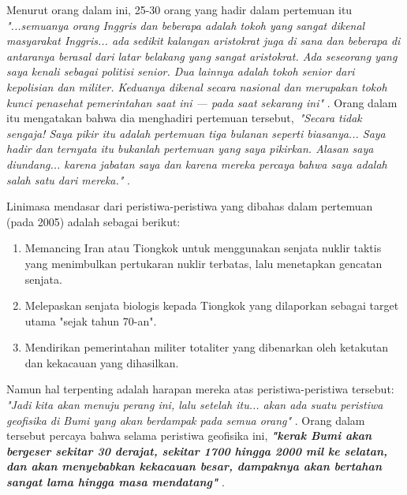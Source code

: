 \documentclass[10pt,twocolumn,letterpaper]{article}
\begin{document}
Menurut orang dalam ini, 25-30 orang yang hadir dalam pertemuan itu \textit{"...semuanya orang Inggris dan beberapa adalah tokoh yang sangat dikenal masyarakat Inggris... ada sedikit kalangan aristokrat juga di sana dan beberapa di antaranya berasal dari latar belakang yang sangat aristokrat. Ada seseorang yang saya kenali sebagai politisi senior. Dua lainnya adalah tokoh senior dari kepolisian dan militer. Keduanya dikenal secara nasional dan merupakan tokoh kunci penasehat pemerintahan saat ini — pada saat sekarang ini"} \cite{4}. Orang dalam itu mengatakan bahwa dia menghadiri pertemuan tersebut,\ \textit{"Secara tidak sengaja! Saya pikir itu adalah pertemuan tiga bulanan seperti biasanya... Saya hadir dan ternyata itu bukanlah pertemuan yang saya pikirkan. Alasan saya diundang... karena jabatan saya dan karena mereka percaya bahwa saya adalah salah satu dari mereka."} \cite{4}.

Linimasa mendasar dari peristiwa-peristiwa yang dibahas dalam pertemuan (pada 2005) adalah sebagai berikut:
\begin{flushleft}
\begin{enumerate}
    \item Memancing Iran atau Tiongkok untuk menggunakan senjata nuklir taktis yang menimbulkan pertukaran nuklir terbatas, lalu menetapkan gencatan senjata.
    \item Melepaskan senjata biologis kepada Tiongkok yang dilaporkan sebagai target utama "sejak tahun 70-an".
    \item Mendirikan pemerintahan militer totaliter yang dibenarkan oleh ketakutan dan kekacauan yang dihasilkan.
\end{enumerate}
\end{flushleft}

Namun hal terpenting adalah harapan mereka atas peristiwa-peristiwa tersebut: \textit{"Jadi kita akan menuju perang ini, lalu setelah itu... akan ada suatu peristiwa geofisika di Bumi yang akan berdampak pada semua orang"} \cite{4}. Orang dalam tersebut percaya bahwa selama peristiwa geofisika ini, \textit{\textbf{"kerak Bumi akan bergeser sekitar 30 derajat, sekitar 1700 hingga 2000 mil ke selatan, dan akan menyebabkan kekacauan besar, dampaknya akan bertahan sangat lama hingga masa mendatang"}} \cite{4}.
\end{document}
